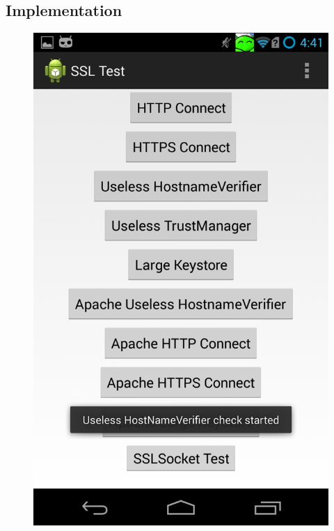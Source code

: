 \documentclass[a4paper, 12pt]{article}
\begin{document}
\subsection{Implementation}
\begin{figure}[!htb]
\centering
\includegraphics[scale=.3]{imgs/impl/testStarted} \hspace{2em} 

\end{figure}
\end{document}
